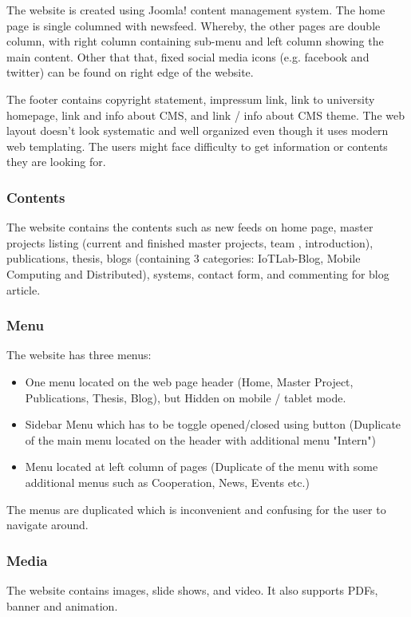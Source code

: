The website is created using Joomla! content management system. The home page is single columned with newsfeed. Whereby, the other pages are double column, with right column containing sub-menu and left column showing the main content. Other that that, fixed social media icons (e.g. facebook and twitter) can be found on right edge of the website.

The footer contains copyright statement, impressum link, link to university homepage, link and info about CMS, and link / info about CMS theme. The web layout doesn't look systematic and well organized even though 
it uses modern web templating. The users might face difficulty to get  information or contents they are looking for.

\subsubsection*{Contents}
The website contains the contents such as new feeds on home page, master projects listing (current and finished master projects, team , introduction), publications, thesis, blogs (containing 3 categories: IoTLab-Blog, Mobile Computing and Distributed), systems, contact form, and commenting for blog article.

\subsubsection*{Menu}
The website has three menus:
\begin{itemize}
\item One menu located on the web page header (Home, Master Project, Publications,  Thesis, Blog), but Hidden on mobile / tablet mode.
\item Sidebar Menu which has to be toggle opened/closed using button (Duplicate of  the main menu located on the header with additional menu "Intern")
\item Menu located at left column of pages (Duplicate of the menu with some  additional menus such as Cooperation, News, Events etc.)
\end{itemize}

The menus are duplicated which is inconvenient and confusing for the user to navigate around.

\subsubsection*{Media}
The website contains images, slide shows, and video. It also supports PDFs, banner and animation.

